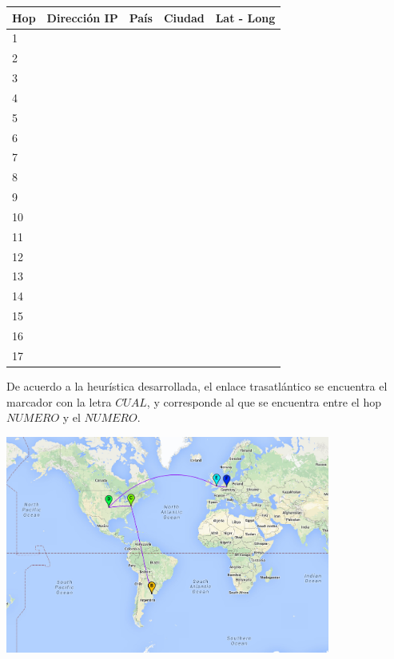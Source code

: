 \begin{center}
 \begin{tabular}{|l|l|l|l|l|}
    \hline
    Hop &Dirección IP &País &Ciudad &Lat - Long \\ \hline \hline
    1 &  & & & \\ \hline
    2 &  & & & \\ \hline
    3 &  & & & \\ \hline
    4 &  & & & \\ \hline
    5 &  & & & \\ \hline
    6 &  & & & \\ \hline
    7 &  & & & \\ \hline
    8 &  & & & \\ \hline
    9 &  & & & \\ \hline
    10 & & & & \\ \hline
    11 & & & & \\ \hline
    12 & & & & \\ \hline
    13 & & & & \\ \hline
    14 & & & & \\ \hline
    15 & & & & \\ \hline
    16 & & & & \\ \hline
    17 & & & & \\ \hline
 \end{tabular}
\end{center}

De acuerdo a la heurística desarrollada, el enlace trasatlántico se encuentra el marcador con la letra $CUAL$, y corresponde al que se encuentra entre el hop $NUMERO$ y el $NUMERO$.

\centerline{\includegraphics[width=0.8\textwidth]{mapas/Alemania.jpeg}}

